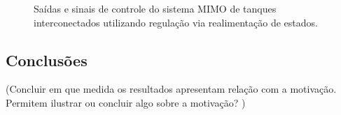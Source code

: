 \begin{figure}[!htp]
    \caption{Saídas e sinais de controle do sistema MIMO de tanques
    interconectados utilizando regulação via realimentação de estados.}
    \vspace{-10pt}
    \hspace{-30pt}
    \label{fig:resultado-do-regulador-com-integrador}
    \begin{minipage}{\linewidth}
        
    \end{minipage}
\end{figure}

\subsection{Conclusões}
(Concluir em que medida os resultados apresentam relação com a motivação.
Permitem ilustrar ou concluir algo sobre a motivação? )
